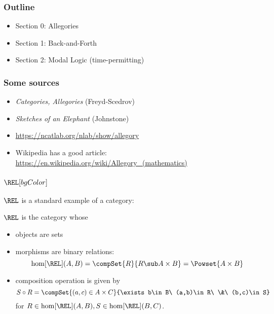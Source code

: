 {\Large

    \begin{frame}
        \frametitle{Outline}
        \begin{itemize}
            \item Section 0: Allegories\pause
            \item Section 1: Back-and-Forth \pause
            \item Section 2: Modal Logic (time-permitting)
        \end{itemize}
    \end{frame}

    \begin{frame}
        \frametitle{Some sources}
        \begin{itemize}
            \item \textit{Categories, Allegories} (Freyd-Scedrov)\pause %
            \item \textit{Sketches of an Elephant} (Johnstone) \pause
            \item \href{https://ncatlab.org/nlab/show/allegory}{https://ncatlab.org/nlab/show/allegory}\pause %
            \item Wikipedia has a good article: \href{https://en.wikipedia.org/wiki/Allegory_(mathematics)}{https://en.wikipedia.org/wiki/Allegory\_(mathematics)}
        \end{itemize}


    \end{frame}


    \begin{frame}
        \frametitle{$\REL[bgColor]$}
        $\REL$ is a standard example of a category:

         $\REL$ is the category whose
            \begin{itemize}\pause
                \item objects are sets\pause
                \item morphisms are binary relations:
                    \[ \hom[\REL](A,B) = \compSet{R}{R\sub A\times B} = \Powset{A\times B} \]\pause
                \item \vspace{-1cm}composition operation is given by
                    \[ S\circ R = \compSet{(a,c)\in A\times C}{\exists b\in B\ (a,b)\in R\ \&\ (b,c)\in S} \]
                    for $R\in\hom[\REL](A,B), S\in\hom[\REL](B,C)$.
            \end{itemize}
    \end{frame}

}
